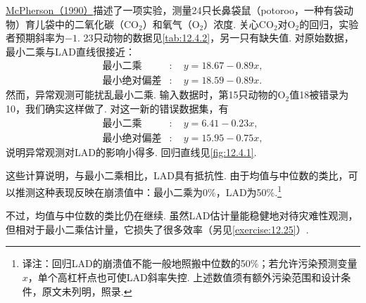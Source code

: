 \begin{example}[灾难性观测]\label{ex:12.4.2}
\hyperref[bib:source217]{McPherson（1990）}描述了一项实验，测量24只长鼻袋鼠（potoroo，一种有袋动物）育儿袋中的二氧化碳（$\mathrm{CO}_2$）和氧气（$\mathrm O_2$）浓度. 关心$\mathrm{CO}_2$对$\mathrm O_2$的回归，实验者预期斜率为$-1$. 23只动物的数据见\autoref{tab:12.4.2}，另一只有缺失值. 对原始数据，最小二乘与LAD直线很接近：
$$\begin{aligned}\text{最小二乘}&:\quad y=18.67-0.89x,\\
\text{最小绝对偏差}&:\quad y=18.59-0.89x.
\end{aligned}$$
然而，异常观测可能扰乱最小二乘. 输入数据时，第15只动物的$\mathrm O_2$值18被错录为10，我们确实这样做了. 对这一新的错误数据集，有
$$\begin{aligned}\text{最小二乘}&:\quad y=6.41-0.23x,\\
\text{最小绝对偏差}&:\quad y=15.95-0.75x,
\end{aligned}$$
说明异常观测对LAD的影响小得多. 回归直线见\autoref{fig:12.4.1}.

这些计算说明，与最小二乘相比，LAD具有抵抗性. 由于均值与中位数的类比，可以推测这种表现反映在崩溃值中：最小二乘为0\%，LAD为50\%.\footnote{译注：回归LAD的崩溃值不能一般地照搬中位数的50\%；若允许污染预测变量$x$，单个高杠杆点也可使LAD斜率失控. 上述数值须有额外污染范围和设计条件，原文未列明，照录.}
\end{example}

不过，均值与中位数的类比仍在继续. 虽然LAD估计量能稳健地对待灾难性观测，但相对于最小二乘估计量，它损失了很多效率（另见\autoref{exercise:12.25}）.


